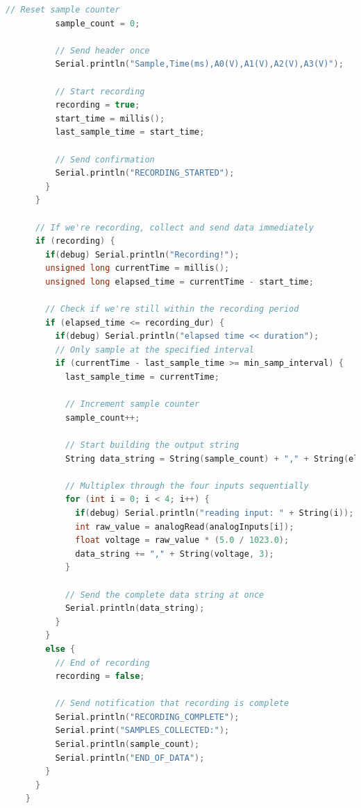 \begin{lstlisting}[style=cstyle, caption=C++ Code on Arduino, label=lst:arduinoCodeApp, language=C++]
          // Reset sample counter
          sample_count = 0;
          
          // Send header once
          Serial.println("Sample,Time(ms),A0(V),A1(V),A2(V),A3(V)");
          
          // Start recording
          recording = true;
          start_time = millis();
          last_sample_time = start_time;
          
          // Send confirmation
          Serial.println("RECORDING_STARTED");
        }
      }
      
      // If we're recording, collect and send data immediately
      if (recording) {
        if(debug) Serial.println("Recording!");
        unsigned long currentTime = millis();
        unsigned long elapsed_time = currentTime - start_time;
        
        // Check if we're still within the recording period
        if (elapsed_time <= recording_dur) {
          if(debug) Serial.println("elapsed time << duration");
          // Only sample at the specified interval
          if (currentTime - last_sample_time >= min_samp_interval) {
            last_sample_time = currentTime;
            
            // Increment sample counter
            sample_count++;
            
            // Start building the output string
            String data_string = String(sample_count) + "," + String(elapsed_time);
            
            // Multiplex through the four inputs sequentially
            for (int i = 0; i < 4; i++) {
              if(debug) Serial.println("reading input: " + String(i));
              int raw_value = analogRead(analogInputs[i]);
              float voltage = raw_value * (5.0 / 1023.0);
              data_string += "," + String(voltage, 3);
            }
            
            // Send the complete data string at once
            Serial.println(data_string);
          }
        }
        else {
          // End of recording
          recording = false;
          
          // Send notification that recording is complete
          Serial.println("RECORDING_COMPLETE");
          Serial.print("SAMPLES_COLLECTED:");
          Serial.println(sample_count);
          Serial.println("END_OF_DATA");
        }
      }
    }
  
\end{lstlisting}
%
%
%
%
%
